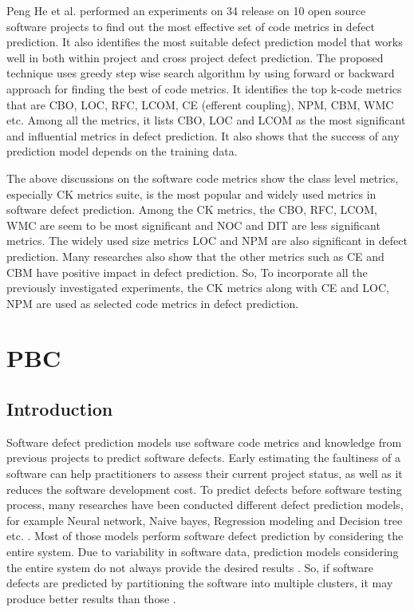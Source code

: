 \documentclass[12pt]{report}
\begin{document}
Peng He et al. \cite{he2015empirical} performed an experiments on 34 release on 10 open source software projects to find out the most effective set of code metrics in defect prediction. It also identifies the most suitable defect prediction model that works well in both within project and cross project defect prediction. The proposed technique uses greedy step wise search algorithm by using forward or backward approach for finding the best of code metrics. It identifies the top k-code metrics that are CBO, LOC, RFC, LCOM, CE (efferent coupling), NPM, CBM, WMC etc. Among all the metrics, it lists CBO, LOC and LCOM as the most significant and influential metrics in defect prediction. It also shows that the success of any prediction model depends on the training data.

The above discussions on the software code metrics show the class level metrics, especially CK metrics suite, is the most popular and widely used metrics in software defect prediction. Among the CK metrics, the CBO, RFC, LCOM, WMC are seem to be most significant and NOC and DIT are less significant metrics. The widely used size metrics LOC and NPM are also significant in defect prediction. Many researches also show that the other metrics such as CE and CBM have positive impact in defect prediction. So, To incorporate all the previously investigated experiments, the CK metrics along with CE and LOC, NPM are used as selected code metrics in defect prediction.     

\chapter{PBC}

\section{Introduction}

Software defect prediction models use software code metrics and knowledge from previous projects to predict software defects. Early estimating the faultiness of a software can help practitioners to assess their current project status, as well as it reduces the software development cost. To predict defects before software testing process, many researches have been conducted different defect prediction models, for example Neural network, Naive bayes, Regression modeling and Decision tree etc. \cite{catal2009systematic}. Most of those models perform software defect prediction by considering the entire system. Due to variability in software data, prediction models considering the entire system do not always provide the desired results \cite{bettenburg2012think}. So, if software defects are predicted by partitioning the software into multiple clusters, it may produce better results than those \cite{scanniello2013class}.
\end{document}
